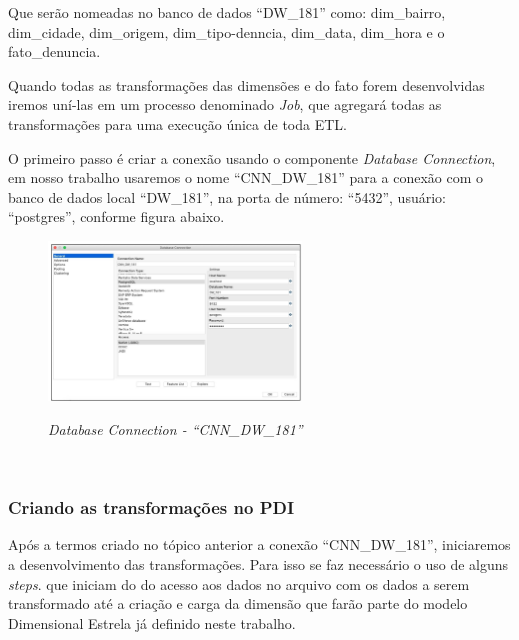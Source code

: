 Que ser\~{a}o nomeadas no banco de dados ``DW\_181'' como: dim\_bairro, dim\_cidade, dim\_origem, dim\_tipo-denncia, dim\_data, dim\_hora e o fato\_denuncia.

Quando todas as transforma\c{c}\~{o}es das dimens\~{o}es e do fato forem desenvolvidas iremos un\'{i}-las em um processo denominado \textit{Job}, que agregar\'{a} todas as transforma\c{c}\~{o}es para uma execu\c{c}\~{a}o única de toda ETL.

O primeiro passo \'{e} criar a conex\~{a}o usando o componente \textit{Database Connection}, em nosso trabalho usaremos o nome ``CNN\_DW\_181'' para a conex\~{a}o com o banco de dados local ``DW\_181'', na porta de número: ``5432'', usu\'{a}rio: ``postgres'', conforme figura abaixo.

\begin{figure}[H]
	\vspace*{0,2cm}
    \centering
    \caption{\textit{Database Connection - ``CNN\_DW\_181''}}
    \includegraphics[width=0.6\textwidth]{./04-figuras/figura-pentaho-database-connection}
    \label{fig:ilustfigpentaho-database-connection}
\end{figure}
\vspace*{-0,9cm}
{\raggedright {}} \\

\subsubsection{Criando as transforma\c{c}\~{o}es no PDI}

Ap\'os a termos criado no t\'opico anterior a conex\~{a}o ``CNN\_DW\_181'', iniciaremos a desenvolvimento das transforma\c{c}\~{o}es. Para isso se faz necess\'{a}rio o uso de alguns \textit{steps}. que iniciam do do acesso aos dados no arquivo com os dados a serem transformado at\'{e} a cria\c{c}\~{a}o e carga da dimens\~{a}o que far\~{a}o parte do modelo Dimensional Estrela j\'{a} definido neste trabalho.

